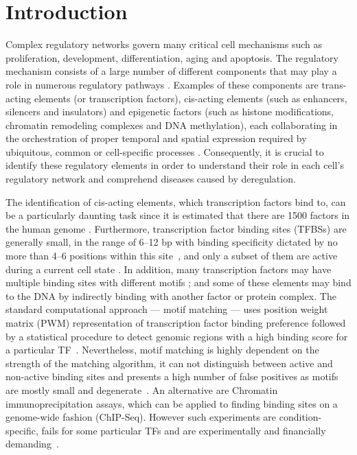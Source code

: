 \documentclass[runningheads,a4paper]{llncs}
\begin{document}
\section{Introduction}

Complex regulatory networks govern many critical cell mechanisms such
as proliferation, development, differentiation, aging and apoptosis.
The regulatory mechanism consists of a large number of different
components that may play a role in numerous regulatory pathways
\cite{encode2012}. Examples of these components are trans-acting
elements (or transcription factors), cis-acting elements (such as
enhancers, silencers and insulators) and epigenetic factors (such as
histone modifications, chromatin remodeling complexes and DNA
methylation), each collaborating in the orchestration of proper
temporal and spatial expression required by ubiquitous, common or
cell-specific processes \cite{maston2006}. Consequently, it is crucial
to identify these regulatory elements in order to understand their
role in each cell's regulatory network and comprehend diseases caused
by deregulation.

The identification of cis-acting elements, which transcription factors
bind to, can be a particularly daunting task since it is estimated
that there are 1500 factors in the human genome \cite{boyle2011}.
Furthermore, transcription factor binding sites (TFBSs) are generally
small, in the range of 6--12 bp with binding specificity dictated by
no more than 4--6 positions within this site~\cite{maston2006}, and
only a subset of them are active during a current cell state
\cite{cuellar2012}. In addition, many transcription factors may have
multiple binding sites with different motifs \cite{maston2006}; and
some of these elements may bind to the DNA by indirectly binding with
another factor or protein complex.  The standard computational
approach --- motif matching --- uses position weight matrix (PWM)
representation of transcription factor binding preference followed by
a statistical procedure to detect genomic regions with a high binding
score for a particular TF~\cite{stormo2000}. Nevertheless, motif matching is highly
dependent on the strength of the matching algorithm, it can not
distinguish between active and non-active binding sites and presents a
high number of false positives as motifs are mostly small and
degenerate~\cite{maston2006}.  An alternative are Chromatin
immunoprecipitation assays, which can be applied to finding binding
sites on a genome-wide fashion (ChIP-Seq).  However such experiments
are condition-specific, fails for some particular TFs and are 
experimentally and financially demanding~\cite{park2009}.
\end{document}
